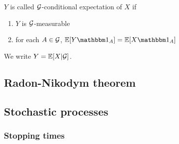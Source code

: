 \begin{defn}
    $Y$ is called $\mathcal{G}$-conditional expectation of $X$ if 
    \begin{enumerate}
        \item $Y$ is $\mathcal{G}$-measurable
        \item for each $A\in \mathcal{G}$, $\EE[Y \ONE_{A}]=\EE[X \ONE_{A}]$
    \end{enumerate}
    We write $Y=\mathbb{E}[X\vert \mathcal{G}]$.
\end{defn}


\subsection{Radon-Nikodym theorem}
\begin{thm}
    
\end{thm}



\subsection{Stochastic processes}

\begin{defn}[Martingale]
    
\end{defn}
 
\begin{thm}
    
\end{thm}

\subsubsection{Stopping times}
\begin{thm}
    
\end{thm}

